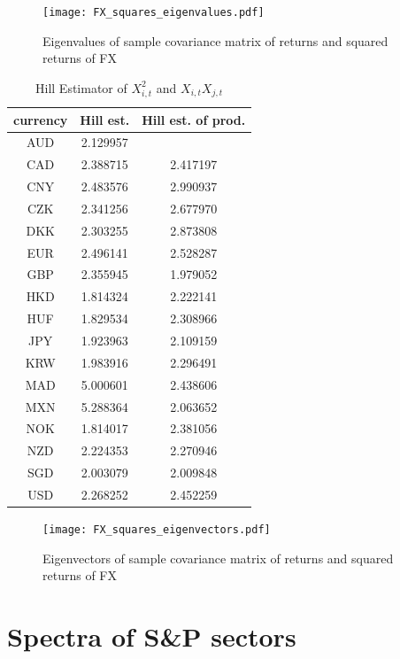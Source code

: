 \documentclass{article}
\begin{document}
\begin{figure}[htb!]
  \centering
  \texttt{[image: FX\_squares\_eigenvalues.pdf]}  
  \caption{Eigenvalues of sample covariance matrix of returns and
    squared returns of FX}
  \label{fig:FX_squares_eigenvalues}
\end{figure}

\begin{table}[htb!]
  \centering
  \begin{tabular}{c|c|c}
    currency & Hill est. & Hill est. of prod.\\
    \hline
    AUD & 2.129957 \\
    CAD & 2.388715 & 2.417197 \\
    CNY & 2.483576 & 2.990937 \\
    CZK & 2.341256 & 2.677970 \\
    DKK & 2.303255 & 2.873808 \\
    EUR & 2.496141 & 2.528287 \\
    GBP & 2.355945 & \textcolor{BrickRed}{1.979052} \\
    HKD & 1.814324 & 2.222141 \\
    HUF & 1.829534 & 2.308966 \\
    JPY & 1.923963 & 2.109159 \\
    KRW & 1.983916 & 2.296491 \\
    MAD & 5.000601 & 2.438606 \\
    MXN & 5.288364 & \textcolor{BrickRed}{2.063652} \\
    NOK & 1.814017 & 2.381056 \\
    NZD & 2.224353 & 2.270946 \\
    SGD & 2.003079 & 2.009848 \\
    USD & 2.268252 & 2.452259 \\
  \end{tabular}
  \caption{Hill Estimator of $X_{i,t}^2$ and $X_{i,t} X_{j,t}$}
  \label{tab:FX_squared_Hill}
\end{table}

\begin{figure}[htb!]
  \centering
  \texttt{[image: FX\_squares\_eigenvectors.pdf]}  
  \caption{Eigenvectors of sample covariance matrix of returns and
    squared returns of FX}
  \label{fig:FX_squares_eigenvectors}
\end{figure}


\section{Spectra of S\&P sectors}
\end{document}
